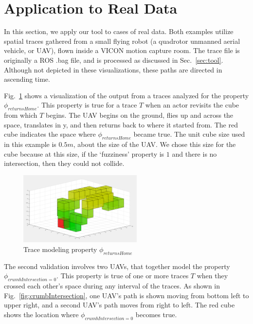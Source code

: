 \section{Application to Real Data}
\label{sec:application}

In this section, we apply our tool to cases of real data.
Both examples utilize spatial traces gathered from a small flying robot (a quadrotor unmanned aerial vehicle, or UAV), flown inside a VICON motion capture room.
The trace file is originally a ROS .bag file, and is processed as discussed in Sec.~\ref{sec:tool}. 
Although not depicted in these visualizations, these paths are directed in ascending time. 

Fig.~\ref{fig:returnsHome} shows a visualization of the output from a traces analyzed for the property $\phi_{returnsHome}$.
This property is true for a trace $T$ when an actor revisits the cube from which $T$ begins.
The UAV begins on the ground, flies up and across the space, translates in y, and then returns back to where it started from.
The red cube indicates the space where $\phi_{returnsHome}$ became true.
The unit cube size used in this example is $0.5m$, about the size of the UAV.
We chose this size for the cube because at this size, if the `fuzziness' property is $1$ and there is no intersection, then they could not collide.


\begin{figure}
  \centering
  \includegraphics[width=0.55\textwidth]{./figures/returnsHome}
    \caption{Trace modeling property $\phi_{returnsHome}$}
    \label{fig:returnsHome}
\end{figure}

The second validation involves two UAVs, that together model the property $\phi_{crumbIntersection=0}$.
This property is true of one or more traces $T$ when they crossed each other's space during any interval of the traces.
As shown in Fig.~\ref{fig:crumbIntersection}, one UAV's path is shown moving from bottom left to upper right, and a second UAV's path moves from right to left.
The red cube shows the location where $\phi_{crumbIntersection=0}$ becomes true.

